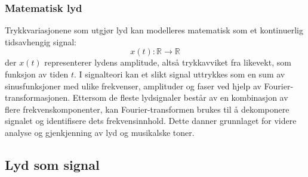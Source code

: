 \subsubsection{Matematisk lyd}
Trykkvariasjonene som utgjør lyd kan modelleres matematisk som et kontinuerlig tidsavhengig signal:
\[
x(t): \mathbb{R} \rightarrow \mathbb{R}
\]
der $x(t)$ representerer lydens amplitude, altså trykkavviket fra likevekt, som funksjon av tiden $t$. 
I signalteori kan et slikt signal uttrykkes som en sum av sinusfunksjoner med ulike frekvenser, amplituder og faser ved hjelp av Fourier-transformasjonen. 
Ettersom de fleste lydsignaler består av en kombinasjon av flere frekvenskomponenter, kan Fourier-transformen brukes til å dekomponere signalet og identifisere dets frekvensinnhold. 
Dette danner grunnlaget for videre analyse og gjenkjenning av lyd og musikalske toner.

\subsection{Lyd som signal}
